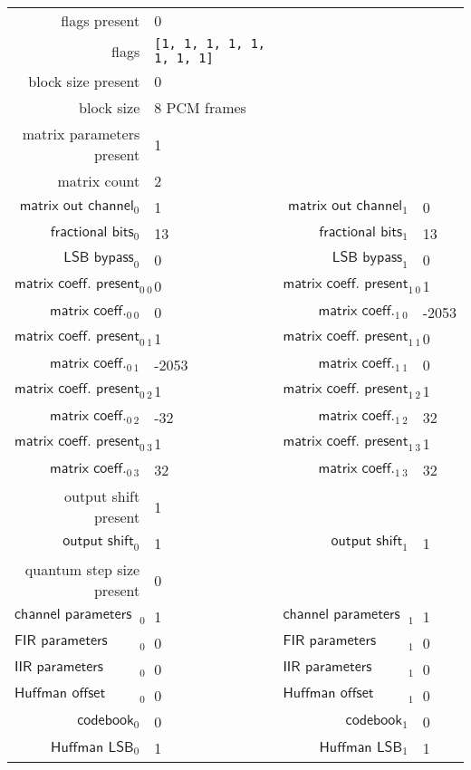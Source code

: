 \begin{table}[h]
{
  \begin{tabular}{rlrl}
    \hline
    \textsf{flags present} & 0 \\
    \textsf{flags} & \texttt{[1, 1, 1, 1, 1, 1, 1, 1]} \\
    \hline
    \textsf{block size present} & 0 \\
    \textsf{block size} & 8 PCM frames \\
    \hline
    \textsf{matrix parameters present} & 1 \\
    \textsf{matrix count} & 2 \\
    $\textsf{matrix out channel}_0$ & 1 &
    $\textsf{matrix out channel}_1$ & 0 \\
    $\textsf{fractional bits}_0$ & 13 &
    $\textsf{fractional bits}_1$ & 13 \\
    $\textsf{LSB bypass}_0$ & 0 &
    $\textsf{LSB bypass}_1$ & 0 \\
    $\textsf{matrix coeff. present}_{0~0}$ & 0 &
    $\textsf{matrix coeff. present}_{1~0}$ & 1 \\
    $\textsf{matrix coeff.}_{0~0}$ & 0 &
    $\textsf{matrix coeff.}_{1~0}$ & -2053 \\
    $\textsf{matrix coeff. present}_{0~1}$ & 1 &
    $\textsf{matrix coeff. present}_{1~1}$ & 0 \\
    $\textsf{matrix coeff.}_{0~1}$ & -2053 &
    $\textsf{matrix coeff.}_{1~1}$ & 0 \\
    $\textsf{matrix coeff. present}_{0~2}$ & 1 &
    $\textsf{matrix coeff. present}_{1~2}$ & 1 \\
    $\textsf{matrix coeff.}_{0~2}$ & -32 &
    $\textsf{matrix coeff.}_{1~2}$ & 32 \\
    $\textsf{matrix coeff. present}_{0~3}$ & 1 &
    $\textsf{matrix coeff. present}_{1~3}$ & 1 \\
    $\textsf{matrix coeff.}_{0~3}$ & 32 &
    $\textsf{matrix coeff.}_{1~3}$ & 32 \\
    \hline
    \textsf{output shift present} & 1 \\
    $\textsf{output shift}_0$ & 1 &
    $\textsf{output shift}_1$ & 1 \\
    \hline
    \textsf{quantum step size present} & 0 \\
    \hline
    $\textsf{channel parameters present}_0$ & 1 &
    $\textsf{channel parameters present}_1$ & 1 \\
    $\textsf{FIR parameters present}_0$ & 0 &
    $\textsf{FIR parameters present}_1$ & 0 \\
    $\textsf{IIR parameters present}_0$ & 0 &
    $\textsf{IIR parameters present}_1$ & 0 \\
    $\textsf{Huffman offset present}_0$ & 0 &
    $\textsf{Huffman offset present}_1$ & 0 \\
    $\textsf{codebook}_0$ & 0 &
    $\textsf{codebook}_1$ & 0 \\
    $\textsf{Huffman LSB}_0$ & 1 &
    $\textsf{Huffman LSB}_1$ & 1 \\
    \hline
  \end{tabular}
}
\end{table}

